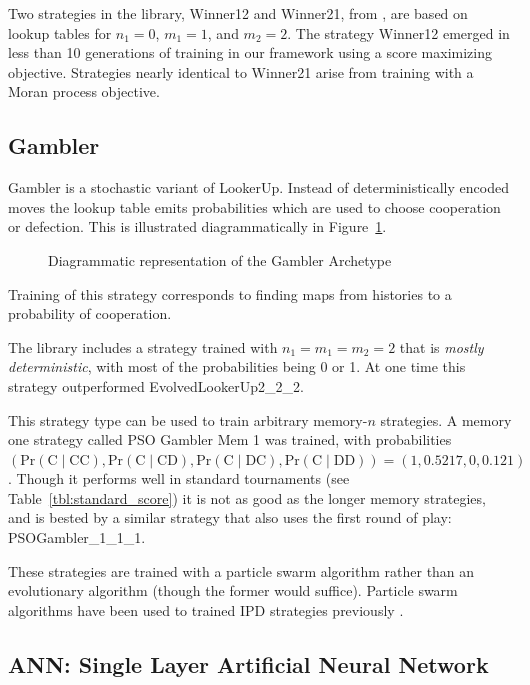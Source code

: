 \documentclass{article}
\begin{document}
Two strategies in the library, Winner12 and Winner21, from \cite{Mathieu2015},
are based on lookup tables for $n_1 = 0$, $m_1 = 1$, and $m_2=2$. The strategy
Winner12 emerged in less than 10 generations of training in our framework using
a score maximizing objective. Strategies nearly identical to Winner21 arise
from training with a Moran process objective.

\subsection{Gambler}

Gambler is a stochastic variant of LookerUp. Instead of deterministically
encoded moves the lookup table emits probabilities which are
used to choose cooperation or defection.
This is illustrated diagrammatically in Figure~\ref{fig:gambler}.

\begin{figure}[!hbtp]
    \centering
    
    \caption{Diagrammatic representation of the Gambler Archetype}
    \label{fig:gambler}
\end{figure}

Training of this strategy corresponds to finding maps from histories to
a probability of cooperation.

The library includes a strategy trained
with $n_1 = m_1 = m_2 = 2$ that is \emph{mostly deterministic}, with most of the
probabilities being 0 or 1. At one time this strategy outperformed
EvolvedLookerUp2\_2\_2.

This strategy type can be used to train arbitrary memory-$n$ strategies. A
memory one strategy called PSO Gambler Mem 1 was trained, with
probabilities $(\text{Pr}(\text{C}\;|\;\text{CC}),
                \text{Pr}(\text{C}\;|\;\text{CD}),
                \text{Pr}(\text{C}\;|\;\text{DC}),
                \text{Pr}(\text{C}\;|\;\text{DD})) = (1, 0.5217, 0, 0.121)$.
Though it performs well in standard tournaments (see
Table~\ref{tbl:standard_score})
it is not as good as the longer memory strategies, and is bested by a similar
strategy that also uses the first round of play: PSOGambler\_1\_1\_1.

These strategies are trained with a particle swarm algorithm rather than an
evolutionary algorithm (though the former would suffice). Particle swarm
algorithms have been used to trained IPD strategies previously
\cite{franken2005particle}.

\subsection{ANN: Single Layer Artificial Neural Network}
\end{document}
